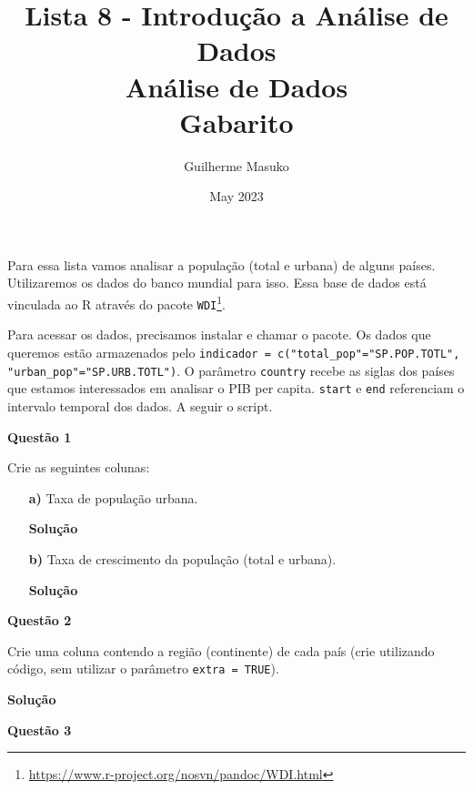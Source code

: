 \documentclass[12pt, a4paper]{article}
\title{Lista 8 - Introdução a Análise de Dados \\
	Análise de Dados \\
	Gabarito}
\author{Guilherme Masuko}
\date{May 2023}
\begin{document}
\clearpage
\maketitle
\thispagestyle{empty}

Para essa lista vamos analisar a população (total e urbana) de alguns países. Utilizaremos os dados do banco mundial para isso. Essa base de dados está vinculada ao R através do pacote \texttt{WDI}\footnote{\url{https://www.r-project.org/nosvn/pandoc/WDI.html}}.

Para acessar os dados, precisamos instalar e chamar o pacote. Os dados que queremos estão armazenados pelo \texttt{indicador = c("total\_pop"="SP.POP.TOTL", "urban\_pop"="SP.URB.TOTL")}. O parâmetro \texttt{country} recebe as siglas dos países que estamos interessados em analisar o PIB per capita. \texttt{start} e \texttt{end} referenciam o intervalo temporal dos dados. A seguir o script.





\textbf{Questão 1}

Crie as seguintes colunas:

\begin{itemize}
	\item[\textbf{a)}] Taxa de população urbana.
	
	
	\textbf{Solução}
	
	
	
	
	
	\item[\textbf{b)}] Taxa de crescimento da população (total e urbana).
	
	
	\textbf{Solução}

	
	
	
	
\end{itemize}



\textbf{Questão 2}

Crie uma coluna contendo a região (continente) de cada país (crie utilizando código, sem utilizar o parâmetro \texttt{extra = TRUE}).


\textbf{Solução}





\textbf{Questão 3}
\end{document}
